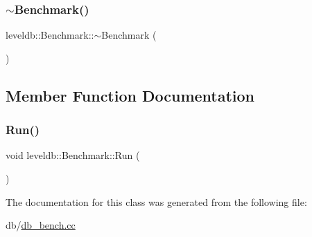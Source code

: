 \mbox{\label{classleveldb_1_1_benchmark_a32bd4ebe6df5e4f664a944d71b066bd5}} 
\subsubsection{\texorpdfstring{$\sim$Benchmark()}{~Benchmark()}}
{\footnotesize\ttfamily leveldb\+::\+Benchmark\+::$\sim$\+Benchmark (\begin{DoxyParamCaption}{ }\end{DoxyParamCaption})\hspace{0.3cm}{\ttfamily [inline]}}



\subsection{Member Function Documentation}
\mbox{\label{classleveldb_1_1_benchmark_a2f262afa0c7d10fcf531fe9657fba490}} 
\subsubsection{\texorpdfstring{Run()}{Run()}}
{\footnotesize\ttfamily void leveldb\+::\+Benchmark\+::\+Run (\begin{DoxyParamCaption}{ }\end{DoxyParamCaption})\hspace{0.3cm}{\ttfamily [inline]}}



The documentation for this class was generated from the following file\+:\begin{DoxyCompactItemize}
\item 
db/\mbox{\hyperlink{db__bench_8cc}{db\+\_\+bench.\+cc}}\end{DoxyCompactItemize}
